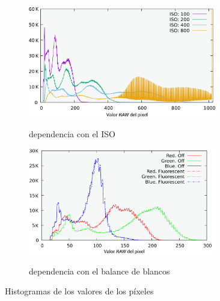 \documentclass[twoside,twocolumn]{article}
\begin{document}
    \begin{figure}[h]
      \centering
      \begin{subfigure}{.47\textwidth}
        \includegraphics[width=0.9\textwidth]{figures/ISO.png}
        \label{fig:ISO}
        \caption{dependencia con el ISO}
      \end{subfigure}
      \begin{subfigure}{.47\textwidth}
        \includegraphics[width=0.9\textwidth]{figures/WB_component_transparent.png}
        \label{fig:WB}
        \caption{dependencia con el balance de blancos}
      \end{subfigure}
      \caption{Histogramas de los valores de los píxeles}
      \label{fig:histo_picamera}
    \end{figure}

\end{document}
